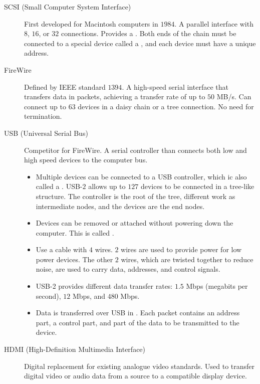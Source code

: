 \documentclass[../notes.tex]{subfiles}
\begin{document}
					\begin{indentparagraph}
						\begin{description}
							\item[SCSI (Small Computer System Interface)] First developed for Macintosh computers in $1984$. A parallel interface with $8$, $16$, or $32$ connections. Provides a . Both ends of the chain must be connected to a special device called a , and each device must have a unique address.
							\item[FireWire] Defined by IEEE standard $1394$. A high-speed serial interface that transfers data in packets, achieving a transfer rate of up to $50$ MB/s. Can connect up to $63$ devices in a daisy chain or a tree connection. No need for termination.
							\item[USB (Universal Serial Bus)] Competitor for FireWire. A serial controller than connects both low and high speed devices to the computer bus.
								\begin{itemize}
									\item Multiple devices can be connected to a USB controller, which ic also called a . USB-$2$ allows up to $127$ devices to be connected in a tree-like structure. The controller is the root of the tree, different  work as intermediate nodes, and the devices are the end nodes.
									\item Devices can be removed or attached without powering down the computer. This is called .
									\item Use a cable with $4$ wires. $2$ wires are used to provide power for low power devices. The other $2$ wires, which are twisted together to reduce noise, are used to carry data, addresses, and control signals.
									\item USB-2 provides different data transfer rates: $1.5$ Mbps (megabits per second), $12$ Mbps, and $480$ Mbps.
									\item Data is transferred over USB in . Each packet contains an address part, a control part, and part of the data to be transmitted to the device.
								\end{itemize}
							\item[HDMI (High-Definition Multimedia Interface)] Digital replacement for existing analogue video standards. Used to transfer digital video or audio data from a source to a compatible display device.
						\end{description}
					\end{indentparagraph}
\end{document}

